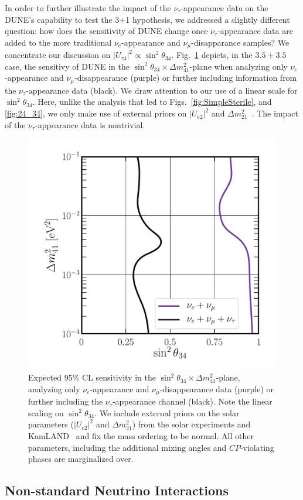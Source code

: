 \documentclass[aps,prd,onecolumn,nofootinbib,superscriptaddress, 11pt]{revtex4}
\begin{document}
In order to further illustrate the impact of the $\nu_{\tau}$-appearance data on the DUNE's capability to test the 3+1 hypothesis, we addressed a slightly different question: how does the sensitivity of DUNE change once $\nu_{\tau}$-appearance data are added to the more traditional $\nu_{e}$-appearance and $\nu_{\mu}$-disapparance samples? We concentrate our discussion on $|U_{\tau4}|^2\propto\sin^2\theta_{34}$. Fig.~\ref{fig:Sterile_new} depicts, in the $3.5+3.5$ case,  the sensitivy of DUNE in the $\sin^2\theta_{34}\times \Delta m^2_{41}$-plane when analyzing only $\nu_e$-appearance and $\nu_\mu$-disappearance (purple) or further including information from the $\nu_\tau$-appearance data (black). We draw attention to our use of a linear scale for $\sin^2\theta_{34}$. Here, unlike the analysis that led to Figs.~\ref{fig:SimpleSterile}, and \ref{fig:24_34},  we only make use of external priors on $|U_{e2}|^2$ and $\Delta m_{21}^2$~\cite{Esteban:2018azc}. The impact of the $\nu_{\tau}$-appearance data is nontrivial. 
\begin{figure}[ht]
\center
\includegraphics[width=0.55\linewidth]{Sterile_TauChannel_s2t34.pdf}
\caption{Expected 95\% CL sensitivity in the  $\sin^2\theta_{34}\times\Delta m^2_{41}$-plane,  analyzing only $\nu_e$-appearance and $\nu_\mu$-disappearance data (purple) or further including the $\nu_\tau$-appearance channel (black). Note the linear scaling on $\sin^2\theta_{34}$. We include external priors on the solar parameters ($|U_{e2}|^2$ and $\Delta m_{21}^2$) from the solar experiments and KamLAND~\cite{Esteban:2018azc} and fix the mass ordering to be normal. All other parameters, including the additional mixing angles and $CP$-violating phases are marginalized over.}
\label{fig:Sterile_new}
\end{figure}


\subsection{Non-standard Neutrino Interactions}
\label{sec:NSI}
\end{document}
